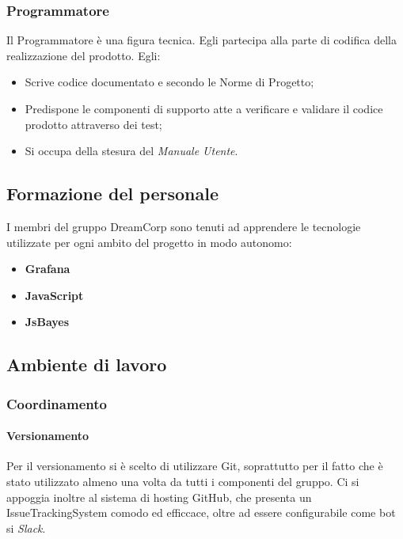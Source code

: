                 \subsubsection{Programmatore}
                    Il Programmatore è una figura tecnica. Egli partecipa alla parte di codifica della realizzazione del prodotto. Egli:
                    \begin{itemize}
                        \item Scrive codice documentato e secondo le Norme di Progetto;
                        \item Predispone le componenti di supporto atte a verificare e validare il codice prodotto attraverso dei test;
                        \item Si occupa della stesura del \textit{Manuale Utente}.
                    \end{itemize}
            \subsection{Formazione del personale}
                I membri del gruppo DreamCorp sono tenuti ad apprendere le tecnologie utilizzate per ogni ambito del progetto in modo autonomo:
                \begin{itemize}
                    \item \textbf{Grafana}
                    \item \textbf{JavaScript}
                    \item \textbf{JsBayes}
                \end{itemize}
                \subsection{Ambiente di lavoro}
                    \subsubsection{Coordinamento}
                        \paragraph{Versionamento} 
                            Per il versionamento si è scelto di utilizzare Git, soprattutto per il fatto che è stato utilizzato almeno una volta da tutti i componenti del gruppo. Ci si appoggia inoltre al sistema di hosting GitHub, che presenta un IssueTrackingSystem comodo ed efficcace, oltre ad essere configurabile come bot si \textit{Slack}.
